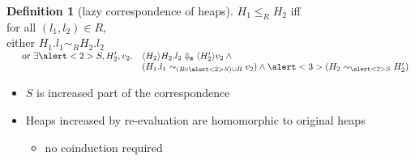 \documentclass[professionalfont,dvipdfmx,cjk,xcolor=dvipsnames,envcountsect,notheorems,12pt]{beamer}
\theoremstyle{definition}
\newtheorem{definition}{Definition}
\newcommand{\EVALNAMEHEAP}[4]{\langle \textcolor{HeapBlue'}{#1} \rangle \textcolor{TermGreen'}{#2} \Downarrow_\mathtt{m} \langle \textcolor{HeapBlue'}{#3} \rangle \textcolor{TermGreen'}{#4}}
\newcommand{\NTH}[2]{#1.#2}
\newcommand{\ISOHEAP}[3]{#2 \sim_{#1} #3}
\newcommand{\CORRHEAPHEAP}[3]{#2 \leq_{#1} #3}
\newcommand{\CORRTERMHEAP}[3]{#2 \sim_{#1} #3}
\begin{document}
\renewcommand{\EVALNAMEHEAP}[4]{\langle #1 \rangle #2 \Downarrow_\mathtt{m} \langle #3 \rangle #4}
\begin{frame}
	\large
	\begin{definition}[lazy correspondence of heaps]
		$\CORRHEAPHEAP{R}{H_1}{H_2}$ iff\\
		for all $(l_1, l_2) \in R$,\\
		either $\CORRTERMHEAP{R}{\NTH{H_1}{l_1}}{\NTH{H_2}{l_2}}$\\
		$\begin{array}{ll}
			\quad\hspace{-2.25pt}~\mbox{or}~\exists \alert<2>{S}, H_2', v_2. & \EVALNAMEHEAP{H_2}{\NTH{H_2}{l_2}}{H_2'}{v_2} \land{} \\
			& (\CORRTERMHEAP{(R\circ \alert<2>{S})\cup R}{\NTH{H_1}{l_1}}{v_2}) \land \alert<3>{(\ISOHEAP{\alert<2>{S}}{H_2}{H_2'})}
		\end{array}$
	\end{definition}
	\pause
	\begin{itemize}
		\item $S$ is increased part of the correspondence
		\pause
		\item Heaps increased by re-evaluation are homomorphic to original heaps
			\begin{itemize}
				\item no coinduction required
			\end{itemize}
	\end{itemize}

\end{frame}
\renewcommand{\EVALNAMEHEAP}[4]{\langle \textcolor{HeapBlue'}{#1} \rangle \textcolor{TermGreen'}{#2} \Downarrow_\mathtt{m} \langle \textcolor{HeapBlue'}{#3} \rangle \textcolor{TermGreen'}{#4}}

\end{document}
